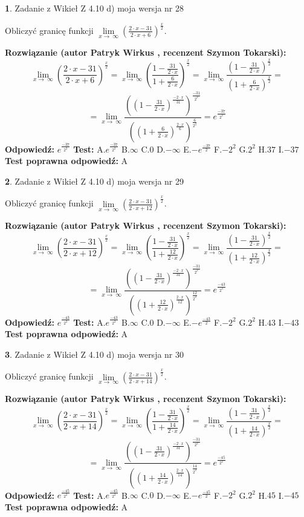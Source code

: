 \documentclass[12pt, a4paper]{article}
\theoremstyle{definition} %
\newtheorem{zad}{}
\newcommand{\zadStart}[1]{\begin{zad}#1\newline}
\newcommand{\zadStop}{\end{zad}}
\newcommand{\rozwStart}[2]{\noindent \textbf{Rozwiązanie (autor #1 , recenzent #2): }\newline}
\newcommand{\rozwStop}{\newline}
\newcommand{\odpStart}{\noindent \textbf{Odpowiedź:}\newline}
\newcommand{\odpStop}{\newline}
\newcommand{\testStart}{\noindent \textbf{Test:}\newline}
\newcommand{\testStop}{\newline}
\newcommand{\kluczStart}{\noindent \textbf{Test poprawna odpowiedź:}\newline}
\newcommand{\kluczStop}{\newline}
\begin{document}
\zadStart{Zadanie z Wikieł Z 4.10 d) moja wersja nr 28}


Obliczyć granicę funkcji  $\lim\limits_{x\to\ \infty}(\frac{2\cdot x-31}{2\cdot x+6})^{\frac{x}{2}}$.
\zadStop
\rozwStart{Patryk Wirkus}{Szymon Tokarski}
$$\lim\limits_{x\to\ \infty}(\frac{2\cdot x-31}{2\cdot x+6})^{\frac{x}{2}} = \lim\limits_{x\to\ \infty}(\frac{1-\frac{31}{2\cdot x}}{1+\frac{6}{2\cdot x}})^{\frac{x}{2}}=\lim\limits_{x\to\ \infty}\frac{(1-\frac{31}{2\cdot x})^{\frac{x}{2}}}{(1+\frac{6}{2\cdot x})^{\frac{x}{2}}}=$$
$$=\lim\limits_{x\to\ \infty}\frac{((1-\frac{31}{2\cdot x})^{\frac{-2\cdot x}{31}})^{\frac{-31}{2^{2}}}}{((1+\frac{6}{2\cdot x})^{\frac{2\cdot x}{6}})^{\frac{6}{2^{2}}}}=e^{\frac{-37}{2^{2}}}$$
\rozwStop
\odpStart
$e^{\frac{-37}{2^{2}}}$
\odpStop
\testStart
A.$e^{\frac{-37}{2^{2}}}$ B.$\infty$ C.$0$ D.$-\infty$ E.$-e^{\frac{-37}{2}}$
F.$-2^{2}$ G.$2^{2}$
H.$37$
I.$-37$
\testStop
\kluczStart
A
\kluczStop



\zadStart{Zadanie z Wikieł Z 4.10 d) moja wersja nr 29}


Obliczyć granicę funkcji  $\lim\limits_{x\to\ \infty}(\frac{2\cdot x-31}{2\cdot x+12})^{\frac{x}{2}}$.
\zadStop
\rozwStart{Patryk Wirkus}{Szymon Tokarski}
$$\lim\limits_{x\to\ \infty}(\frac{2\cdot x-31}{2\cdot x+12})^{\frac{x}{2}} = \lim\limits_{x\to\ \infty}(\frac{1-\frac{31}{2\cdot x}}{1+\frac{12}{2\cdot x}})^{\frac{x}{2}}=\lim\limits_{x\to\ \infty}\frac{(1-\frac{31}{2\cdot x})^{\frac{x}{2}}}{(1+\frac{12}{2\cdot x})^{\frac{x}{2}}}=$$
$$=\lim\limits_{x\to\ \infty}\frac{((1-\frac{31}{2\cdot x})^{\frac{-2\cdot x}{31}})^{\frac{-31}{2^{2}}}}{((1+\frac{12}{2\cdot x})^{\frac{2\cdot x}{12}})^{\frac{12}{2^{2}}}}=e^{\frac{-43}{2^{2}}}$$
\rozwStop
\odpStart
$e^{\frac{-43}{2^{2}}}$
\odpStop
\testStart
A.$e^{\frac{-43}{2^{2}}}$ B.$\infty$ C.$0$ D.$-\infty$ E.$-e^{\frac{-43}{2}}$
F.$-2^{2}$ G.$2^{2}$
H.$43$
I.$-43$
\testStop
\kluczStart
A
\kluczStop



\zadStart{Zadanie z Wikieł Z 4.10 d) moja wersja nr 30}


Obliczyć granicę funkcji  $\lim\limits_{x\to\ \infty}(\frac{2\cdot x-31}{2\cdot x+14})^{\frac{x}{2}}$.
\zadStop
\rozwStart{Patryk Wirkus}{Szymon Tokarski}
$$\lim\limits_{x\to\ \infty}(\frac{2\cdot x-31}{2\cdot x+14})^{\frac{x}{2}} = \lim\limits_{x\to\ \infty}(\frac{1-\frac{31}{2\cdot x}}{1+\frac{14}{2\cdot x}})^{\frac{x}{2}}=\lim\limits_{x\to\ \infty}\frac{(1-\frac{31}{2\cdot x})^{\frac{x}{2}}}{(1+\frac{14}{2\cdot x})^{\frac{x}{2}}}=$$
$$=\lim\limits_{x\to\ \infty}\frac{((1-\frac{31}{2\cdot x})^{\frac{-2\cdot x}{31}})^{\frac{-31}{2^{2}}}}{((1+\frac{14}{2\cdot x})^{\frac{2\cdot x}{14}})^{\frac{14}{2^{2}}}}=e^{\frac{-45}{2^{2}}}$$
\rozwStop
\odpStart
$e^{\frac{-45}{2^{2}}}$
\odpStop
\testStart
A.$e^{\frac{-45}{2^{2}}}$ B.$\infty$ C.$0$ D.$-\infty$ E.$-e^{\frac{-45}{2}}$
F.$-2^{2}$ G.$2^{2}$
H.$45$
I.$-45$
\testStop
\kluczStart
A
\kluczStop
\end{document}
